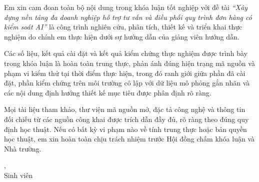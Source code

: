 
Em xin cam đoan toàn bộ nội dung trong khóa luận tốt nghiệp với đề tài \emph{``Xây dựng nền tảng đa doanh nghiệp hỗ trợ tư vấn và điều phối quy trình đơn hàng có kiểm soát AI''} là công trình nghiên cứu, phân tích, thiết kế và triển khai thực nghiệm do chính em thực hiện dưới sự hướng dẫn của giảng viên hướng dẫn.

Các số liệu, kết quả cài đặt và kết quả kiểm chứng thực nghiệm được trình bày trong khóa luận là hoàn toàn trung thực, phản ánh đúng hiện trạng mã nguồn và phạm vi kiểm thử tại thời điểm thực hiện, trong đó ranh giới giữa phần đã cài đặt, phần kiểm chứng trên môi trường cô lập với dữ liệu mô phỏng gắn nhãn và các nội dung định hướng thiết kế mục tiêu được phân định rõ ràng.

Mọi tài liệu tham khảo, thư viện mã nguồn mở, đặc tả công nghệ và thông tin đối chiếu từ các nguồn công khai được trích dẫn đầy đủ, rõ ràng theo đúng quy định học thuật. Nếu có bất kỳ vi phạm nào về tính trung thực hoặc bản quyền học thuật, em xin hoàn toàn chịu trách nhiệm trước Hội đồng chấm khóa luận và Nhà trường.

\vspace{1cm}
\begin{flushright}
\ThesisCity, \ThesisDate\\[0.3cm]
Sinh viên\\[1.5cm]
\StudentName
\end{flushright}
